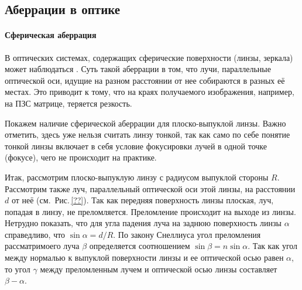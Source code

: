 \subsection{Аберрации в оптике}
\paragraph{Сферическая аберрация}
В оптических системах, содержащих сферические поверхности (линзы, зеркала) может наблюдаться . Суть такой аберрации в том, что лучи, параллельные оптической оси, идущие на разном расстоянии от нее собираются в разных её местах. Это приводит к тому, что на краях получаемого изображения, например, на ПЗС матрице, теряется резкость.

Покажем наличие сферической аберрации для плоско-выпуклой линзы. Важно отметить, здесь уже нельзя считать линзу тонкой, так как само по себе понятие тонкой линзы включает в себя условие фокусировки лучей в одной точке (фокусе), чего не происходит на практике. 

Итак, рассмотрим плоско-выпуклую линзу с радиусом выпуклой стороны $R$. Рассмотрим также луч, параллельный оптической оси этой линзы, на расстоянии $d$ от неё (см.~Рис.\,\ref{??}). Так как передняя поверхность линзы плоская, луч, попадая в линзу, не преломляется. Преломление происходит на выходе из линзы. Нетрудно показать, что для угла падения луча на заднюю поверхность линзы $\alpha$ справедливо, что $\sin \alpha = d/R$. По закону Снеллиуса угол преломления рассматримоего луча $\beta$ определяется соотношением $\sin \beta = n \sin \alpha$. Так как угол между нормалью к выпуклой поверхности линзы и ее оптической осью равен $\alpha$, то угол $\gamma$ между преломленным лучем и оптической осью линзы составляет $\beta - \alpha$.

